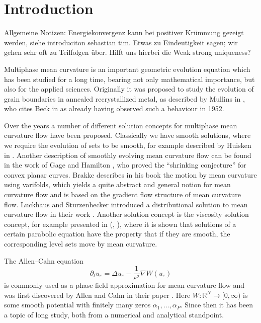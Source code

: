 \chapter{Introduction}

Allgemeine Notizen: Energiekonvergenz kann bei positiver Krümmung gezeigt 
werden, siehe introduciton sebastian tim. 
Etwas zu Eindeutigkeit sagen; wir gehen sehr oft zu Teilfolgen über. Hilft uns 
hierbei die Weak strong uniqueness?

Multiphase mean curvature is an important geometric evolution equation which 
has been studied for a long time, bearing not only mathematical importance, but 
also for the applied sciences. Originally it was proposed to study the 
evolution of grain boundaries in annealed recrystallized metal, as described by
Mullins in \cite{mullins_two_dimensional_motion_of_idealized_grain_boundaries}, 
who cites Beck in \cite{beck_metal_interfaces} as already having observed such 
a behaviour in 1952. 

Over the years a number of different solution concepts for multiphase mean 
curvature flow have been proposed. Classically we have smooth solutions, where 
we require the evolution of sets to be smooth, for example described by Huisken 
in \cite{huisken_asymptotic_behavior_for_singuliarities_of_mcf}. 
Another description of smoothly evolving mean curvature flow can be found in 
the work of Gage and Hamilton 
\cite{gage_hamilton_the_heat_equation_shrinking_convex_plane_curves}, who 
proved the \enquote{shrinking conjecture} for convex planar curves.
Brakke describes in his book 
\cite{brakke_kenneth_motion_of_surface_by_mean_curvature} the motion by mean 
curvature using varifolds, which yields a quite abstract and general notion for 
mean curvature flow and is based on the gradient flow structure of mean 
curvature flow. 
Luckhaus and Sturzenhecker introduced a 
distributional solution to mean curvature flow in their work 
\cite{luckhaus_sturzenhecker_implicit_time_discretization_for_mcf}. Another 
solution concept is the viscosity solution concept, for example presented in 
(\cite{chen_giga_goto_uniqueness_and_existence_of_generalized_mcf_equations},
\cite{evans_spruck_motion_of_level_sets_by_mean_curvature}), where it is shown 
that solutions of a certain parabolic equation have the property that if they 
are smooth, the corresponding level sets move by mean curvature.

The Allen--Cahn equation
\begin{equation}
	\label{ac_intro}
	\partial_{ t } u_{ \varepsilon }
	=
	\Delta u_{ \varepsilon }
	-
	\frac{ 1 }{ \varepsilon^{ 2 } }
	\nabla W ( u_{ \varepsilon } )
\end{equation}
is commonly used as a phase-field approximation for mean curvature flow and was 
first discovered by Allen and Cahn in their paper 
\cite{allen_cahn_microscopig_theory_for_antiphase_boundary_motion}. Here $ W 
\colon \mathbb{ R }^{ N } \to [ 0 , \infty ) $ is some smooth potential with 
finitely many zeros $ \alpha_{ 1 } , \dotsc, \alpha_{ P } $.
Since then it has been a topic of long study, both from a numerical and 
analytical standpoint. 

